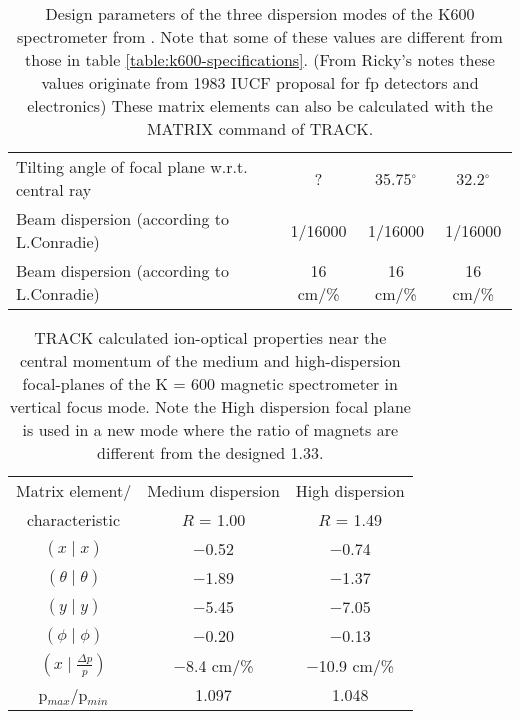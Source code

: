 \documentclass[11pt]{report}
\begin{document}
\begin{landscape}
\begin{table}
\begin{tabular}{|l|c|c|c|}
Tilting angle of focal plane w.r.t. central ray & ? & 35.75$^{\circ}$ & 32.2$^{\circ}$ \\
Beam dispersion (according to L.Conradie) &1/16000  &1/16000  &1/16000\\
Beam dispersion (according to L.Conradie) &16 cm/\%  &16 cm/\%  &16 cm/\% \\
\hline 
\end{tabular}
\caption{Design parameters of the three dispersion modes of the K600
spectrometer from \cite{Sch86}.
Note that some of these values are different from those in 
table \ref{table:k600-specifications}.
(From Ricky's notes these values originate from 1983 IUCF proposal for fp detectors and electronics)
These matrix elements can also be calculated with the MATRIX command of TRACK.
} %
\label{table:three-disp-planes-a}
\end{table}

\end{landscape}




\begin{table}
\centering
\begin{tabular}{|c|c|c|}
\hline
 Matrix element/                    & Medium dispersion  & High dispersion  \\
 characteristic                     & $R$ = 1.00          & $R$ = 1.49     \\
\hline
$\left( x \mid x\right)$            & $-$0.52              & $-$0.74  \\
$\left( \theta \mid \theta \right)$ & $-$1.89              & $-$1.37  \\
$\left( y \mid y\right)$            & $-$5.45              & $-$7.05  \\
$\left( \phi \mid \phi \right)$	    & $-$0.20	         & $-$0.13  \\
$\left( x \mid \frac{\Delta p}{p}\right)$ & $-$8.4 cm/\%   & $-$10.9 cm/\%\\
p$_{max}$/p$_{min}$                       & 1.097        & 1.048\\
\hline 
\end{tabular}
\caption{TRACK calculated ion-optical properties near the central momentum 
of the medium and high-dispersion focal-planes 
of the K = 600 magnetic spectrometer in vertical focus mode.
Note the High dispersion focal plane is used in a new mode where
the ratio of magnets are different from the designed 1.33.
} 
\label{table:hi-disp-planes}
\end{table}
\end{document}
